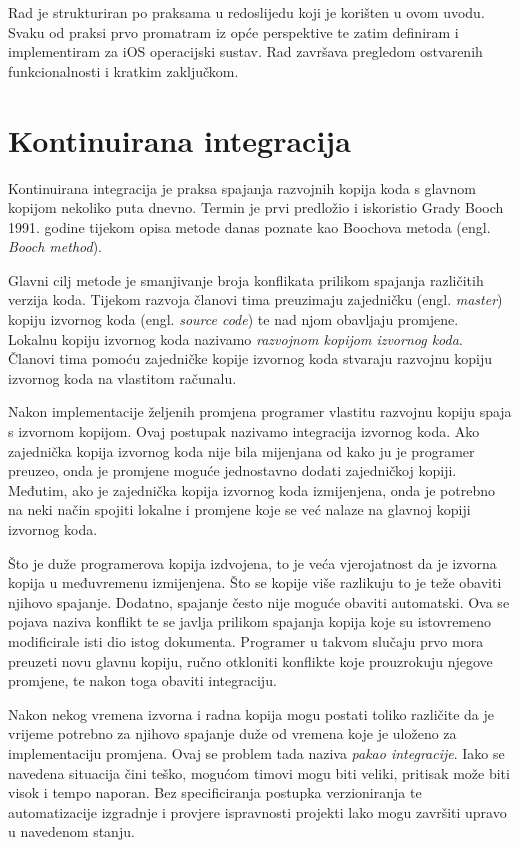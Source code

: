 \documentclass[times, utf8, diplomski, numeric]{fer}
\newcommand{\eng}[1]{(engl. \textit{#1})}
\begin{document}
Rad je strukturiran po praksama u redoslijedu koji je korišten u ovom uvodu. Svaku od praksi prvo promatram iz opće perspektive te zatim definiram i implementiram za iOS operacijski sustav. Rad završava pregledom ostvarenih funkcionalnosti i kratkim zaključkom.


\chapter{Kontinuirana integracija} \label{header:Kontinuirana_Integracija}

Kontinuirana integracija je praksa spajanja razvojnih kopija koda s glavnom kopijom nekoliko puta dnevno. Termin je prvi predložio i iskoristio Grady Booch 1991. godine tijekom opisa metode danas poznate kao Boochova metoda \eng{Booch method}\citep{wiki:BoochMethod}.

Glavni cilj metode je smanjivanje broja konflikata prilikom spajanja različitih verzija koda. Tijekom razvoja članovi tima preuzimaju zajedničku \eng{master} kopiju izvornog koda \eng{source code} te nad njom obavljaju promjene. Lokalnu kopiju izvornog koda nazivamo \textit{razvojnom kopijom izvornog koda}. Članovi tima pomoću zajedničke kopije izvornog koda stvaraju razvojnu kopiju izvornog koda na vlastitom računalu.

Nakon implementacije željenih promjena programer vlastitu razvojnu kopiju spaja s izvornom kopijom. Ovaj postupak nazivamo integracija izvornog koda. Ako zajednička kopija izvornog koda nije bila mijenjana od kako ju je programer preuzeo, onda je promjene moguće jednostavno dodati zajedničkoj kopiji. Međutim, ako je zajednička kopija izvornog koda izmijenjena, onda je potrebno na neki način spojiti lokalne i promjene koje se već nalaze na glavnoj kopiji izvornog koda.

Što je duže programerova kopija izdvojena, to je veća vjerojatnost da je izvorna kopija u međuvremenu izmijenjena. Što se kopije više razlikuju to je teže obaviti njihovo spajanje. Dodatno, spajanje često nije moguće obaviti automatski. Ova se pojava naziva konflikt te se javlja prilikom spajanja kopija koje su istovremeno modificirale isti dio istog dokumenta. Programer u takvom slučaju prvo mora preuzeti novu glavnu kopiju, ručno otkloniti konflikte koje prouzrokuju njegove promjene, te nakon toga obaviti integraciju.

Nakon nekog vremena izvorna i radna kopija mogu postati toliko različite da je vrijeme potrebno za njihovo spajanje duže od vremena koje je uloženo za implementaciju promjena. Ovaj se problem tada naziva \textit{pakao integracije}. Iako se navedena situacija čini teško, mogućom timovi mogu biti veliki, pritisak može biti visok i tempo naporan. Bez specificiranja postupka verzioniranja te automatizacije izgradnje i provjere ispravnosti projekti lako mogu završiti upravo u navedenom stanju.
\end{document}
